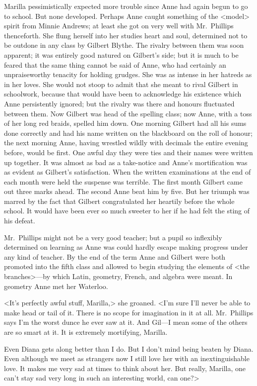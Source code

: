Marilla pessimistically expected more trouble since Anne had again begun to go to school. But none developed. Perhaps Anne caught something of the <model> spirit from Minnie Andrews; at least she got on very well with Mr.~Phillips thenceforth. She flung herself into her studies heart and soul, determined not to be outdone in any class by Gilbert Blythe. The rivalry between them was soon apparent; it was entirely good natured on Gilbert's side; but it is much to be feared that the same thing cannot be said of Anne, who had certainly an unpraiseworthy tenacity for holding grudges. She was as intense in her hatreds as in her loves. She would not stoop to admit that she meant to rival Gilbert in schoolwork, because that would have been to acknowledge his existence which Anne persistently ignored; but the rivalry was there and honours fluctuated between them. Now Gilbert was head of the spelling class; now Anne, with a toss of her long red braids, spelled him down. One morning Gilbert had all his sums done correctly and had his name written on the blackboard on the roll of honour; the next morning Anne, having wrestled wildly with decimals the entire evening before, would be first. One awful day they were ties and their names were written up together. It was almost as bad as a take-notice and Anne's mortification was as evident as Gilbert's satisfaction. When the written examinations at the end of each month were held the suspense was terrible. The first month Gilbert came out three marks ahead. The second Anne beat him by five. But her triumph was marred by the fact that Gilbert congratulated her heartily before the whole school. It would have been ever so much sweeter to her if he had felt the sting of his defeat.

Mr.~Phillips might not be a very good teacher; but a pupil so inflexibly determined on learning as Anne was could hardly escape making progress under any kind of teacher. By the end of the term Anne and Gilbert were both promoted into the fifth class and allowed to begin studying the elements of <the branches>—by which Latin, geometry, French, and algebra were meant. In geometry Anne met her Waterloo.

<It's perfectly awful stuff, Marilla,> she groaned. <I'm sure I'll never be able to make head or tail of it. There is no scope for imagination in it at all. Mr.~Phillips says I'm the worst dunce he ever saw at it. And Gil—I mean some of the others are so smart at it. It is extremely mortifying, Marilla.

Even Diana gets along better than I do. But I don't mind being beaten by Diana. Even although we meet as strangers now I still love her with an inextinguishable love. It makes me very sad at times to think about her. But really, Marilla, one can't stay sad very long in such an interesting world, can one?>